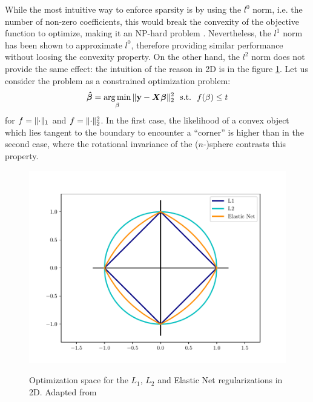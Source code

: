While the most intuitive way to enforce sparsity is by using the $l^0$ norm, i.e. the number of non-zero coefficients, this would break the convexity of the objective function to optimize, making it an NP-hard problem \cite{donoho_compressed_2006}. Nevertheless, the $l^1$ norm has been shown to approximate $l^0$, therefore providing similar performance without loosing the convexity property.
On the other hand, the $l^2$ norm does not provide the same effect: the intuition of the reason in 2D is in the figure \ref{fig:reg_norms}. Let us consider the problem as a constrained optimization problem:
\begin{equation*}
    \boldsymbol{\hat{\beta}} = \operatorname*{arg\,min}_{\beta}{\lVert\mathbf{y} - \boldsymbol{X}\boldsymbol{\beta}\rVert_2^2}~~\text{s.t.}~~f(\beta) \leq t
\end{equation*}
for $f=\lVert\cdot\rVert_1$ and $f=\lVert\cdot\rVert_2^2$. In the first case, the likelihood of a convex object which lies tangent to the boundary to encounter a ``corner'' is higher than in the second case, where the rotational invariance of the ($n$-)sphere contrasts this property.

\begin{figure}
  \caption{Optimization space for the $L_1$, $L_2$ and Elastic Net regularizations in 2D. Adapted from \cite{noauthor_lasso_nodate}}
  \centering
    \includegraphics[width=1\textwidth]{Figures/reg_norms.pdf}
  \label{fig:reg_norms}
\end{figure}

